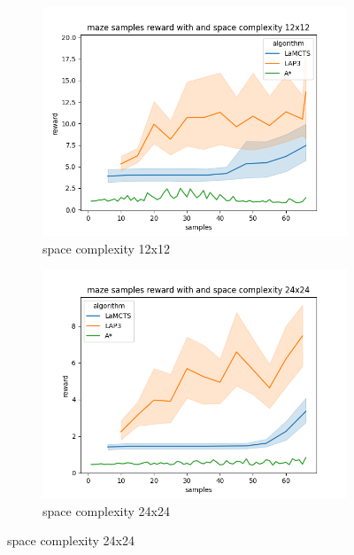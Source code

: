 \documentclass[bibliography=totoc]{scrartcl}
\begin{document}
\begin{figure}[H]
	\centering
	\begin{subfigure}[b]{0.3\linewidth}
		\includegraphics[width=\linewidth]{img/maze_samples__reward_b_8_LAP3_MCTS_AStar_interrupted_12.png}
        \caption{space complexity 12x12}	
    \end{subfigure}
	\begin{subfigure}[b]{0.3\linewidth}
		\includegraphics[width=\linewidth]{img/maze_samples__reward_b_8_LAP3_MCTS_AStar_interrupted_24.png}
		\caption{space complexity 24x24}
	\end{subfigure}

\end{figure}
\end{document}
